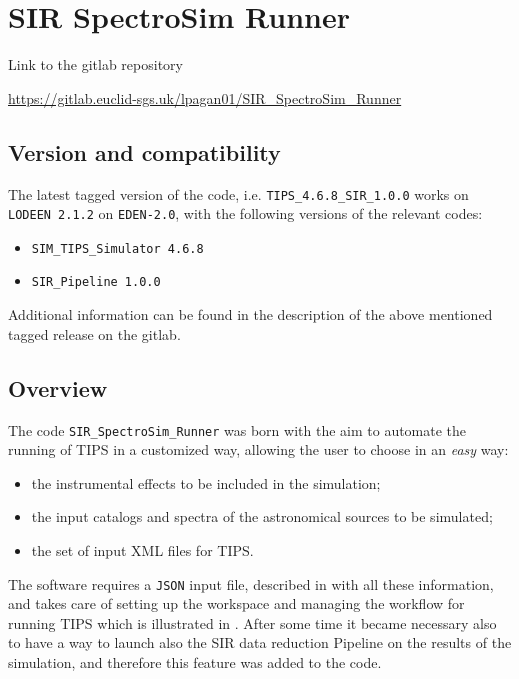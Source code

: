 \section{SIR SpectroSim Runner}\label{sec:sir_runner}

Link to the gitlab repository

\begin{center}
\hypertarget{url:sir_runner_gitlab}{\url{https://gitlab.euclid-sgs.uk/lpagan01/SIR_SpectroSim_Runner}}
\end{center}

\subsection{Version and compatibility}

The latest tagged version of the code, i.e. \verb+TIPS_4.6.8_SIR_1.0.0+ works on \verb+LODEEN 2.1.2+ on \verb+EDEN-2.0+, with the following versions of the relevant codes: 

\begin{itemize}
\item \verb+SIM_TIPS_Simulator 4.6.8+
\item \verb+SIR_Pipeline 1.0.0+
\end{itemize}

 Additional information can be found in the description of the above mentioned tagged release on the gitlab.

\subsection{Overview}

The code \verb+SIR_SpectroSim_Runner+ was born with the aim to automate the running of TIPS in a customized way, allowing the user to choose in an \emph{easy} way:

\begin{itemize}
\item the instrumental effects to be included in the simulation;
\item the input catalogs and spectra of the astronomical sources to be simulated;
\item the set of input XML files for TIPS.
\end{itemize}

The software requires a \verb+JSON+ input file, described in  with all these information, and takes care of setting up the workspace and managing the workflow for running TIPS which is illustrated in . After some time it became necessary also to have a way to launch also the SIR data reduction Pipeline on the results of the simulation, and therefore this feature was added to the code.

